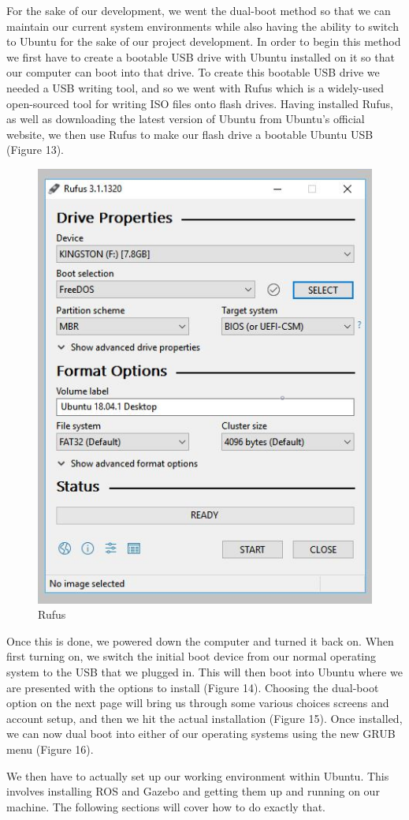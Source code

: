 \documentclass[12pt]{report}
\begin{document}
For the sake of our development, we went the dual-boot method so that we can maintain our current system environments while also having the ability to switch to Ubuntu for the sake of our project development. In order to begin this method we first have to create a bootable USB drive with Ubuntu installed on it so that our computer can boot into that drive. To create this bootable USB drive we needed a USB writing tool, and so we went with Rufus which is a widely-used open-sourced tool for writing ISO files onto flash drives. Having installed Rufus, as well as downloading the latest version of Ubuntu from Ubuntu's official website, we then use Rufus to make our flash drive a bootable Ubuntu USB (Figure 13).





\begin{figure}[h]
	\centering
	\includegraphics[width=0.50\linewidth]{rufus}
	\caption{Rufus}
\end{figure}

Once this is done, we powered down the computer and turned it back on. When first turning on, we switch the initial boot device from our normal operating system to the USB that we plugged in. This will then boot into Ubuntu where we are presented with the options to install (Figure 14). Choosing the dual-boot option on the next page will bring us through some various choices screens and account setup, and then we hit the actual installation (Figure 15). Once installed, we can now dual boot into either of our operating systems using the new GRUB menu (Figure 16).

We then have to actually set up our working environment within Ubuntu. This involves installing ROS and Gazebo and getting them up and running on our machine. The following sections will cover how to do exactly that.
\end{document}
